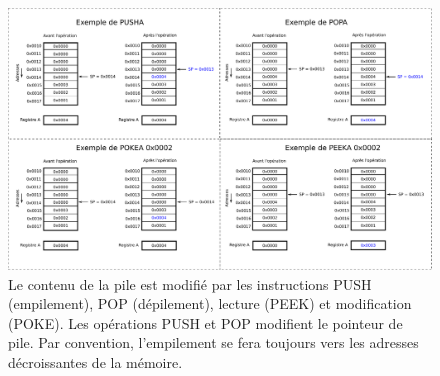 \begin{figure}[htbp]
%    
\centering\includegraphics[width=\columnwidth]{Figs/stack.pdf}
\caption{\label{fig:stack} Le contenu de la pile est modifié par les instructions PUSH (empilement), POP (dépilement), lecture (PEEK) et modification (POKE). Les opérations PUSH et POP modifient le pointeur de pile. Par convention, l'empilement se fera toujours vers les adresses décroissantes de la mémoire.}
\end{figure}

